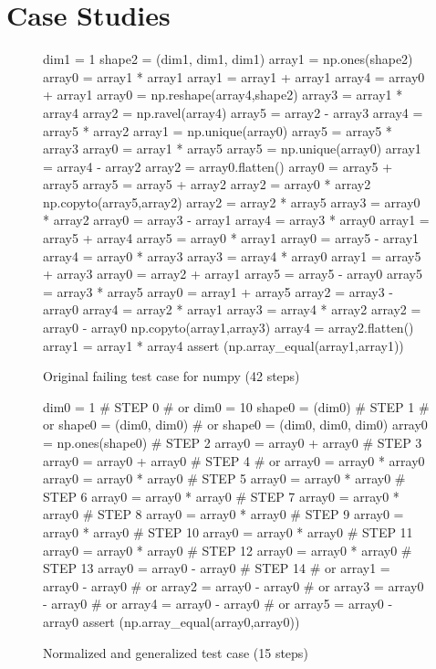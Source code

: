 \section {Case Studies}

\begin{figure}
{\scriptsize
\begin{code}
 dim1 = 1 
 shape2 = (dim1, dim1, dim1) 
 array1 = np.ones(shape2) 
 array0 = array1 * array1 
 array1 = array1 + array1 
 array4 = array0 + array1 
 array0 = np.reshape(array4,shape2) 
 array3 = array1 * array4 
 array2 = np.ravel(array4) 
 array5 = array2 - array3 
 array4 = array5 * array2 
 array1 = np.unique(array0) 
 array5 = array5 * array3 
 array0 = array1 * array5 
 array5 = np.unique(array0) 
 array1 = array4 - array2 
 array2 = array0.flatten() 
 array0 = array5 + array5 
 array5 = array5 + array2 
 array2 = array0 * array2 
 np.copyto(array5,array2) 
 array2 = array2 * array5 
 array3 = array0 * array2 
 array0 = array3 - array1 
 array4 = array3 * array0 
 array1 = array5 + array4 
 array5 = array0 * array1 
 array0 = array5 - array1 
 array4 = array0 * array3 
 array3 = array4 * array0 
 array1 = array5 + array3 
 array0 = array2 + array1 
 array5 = array5 - array0 
 array5 = array3 * array5 
 array0 = array1 + array5 
 array2 = array3 - array0 
 array4 = array2 * array1 
 array3 = array4 * array2 
 array2 = array0 - array0 
 np.copyto(array1,array3) 
 array4 = array2.flatten() 
 array1 = array1 * array4
 assert (np.array\_equal(array1,array1))
\end{code}
}
\caption{Original failing test case for numpy (42 steps)}
\end{figure}

\begin{figure}
{\scriptsize
\begin{code}
dim0 = 1                            \# STEP 0
\#  or dim0 = 10 
shape0 = (dim0)                     \# STEP 1
\#  or shape0 = (dim0, dim0) 
\#  or shape0 = (dim0, dim0, dim0) 
array0 = np.ones(shape0)            \# STEP 2
array0 = array0 + array0            \# STEP 3
array0 = array0 + array0            \# STEP 4
\#  or array0 = array0 * array0 
array0 = array0 * array0            \# STEP 5
array0 = array0 * array0            \# STEP 6
array0 = array0 * array0            \# STEP 7
array0 = array0 * array0            \# STEP 8
array0 = array0 * array0            \# STEP 9
array0 = array0 * array0            \# STEP 10
array0 = array0 * array0            \# STEP 11
array0 = array0 * array0            \# STEP 12
array0 = array0 * array0            \# STEP 13
array0 = array0 - array0            \# STEP 14
\#  or array1 = array0 - array0 
\#  or array2 = array0 - array0 
\#  or array3 = array0 - array0 
\#  or array4 = array0 - array0 
\#  or array5 = array0 - array0 
assert (np.array\_equal(array0,array0))
\end{code}
}
\caption{Normalized and generalized test case (15 steps)}
\end{figure}

